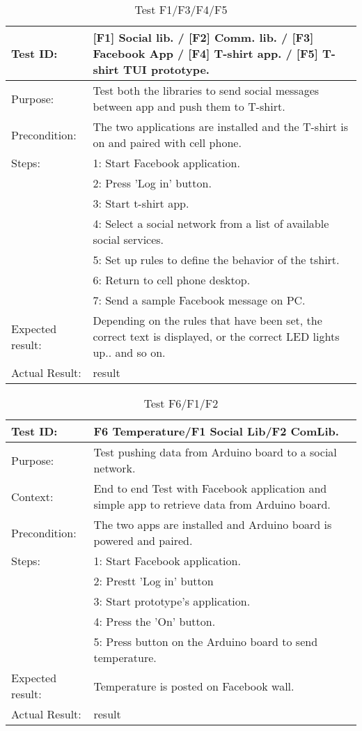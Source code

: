 \begin{table}[h!]
\begin{tabular}{|l|p{10cm}|}
\hline Test ID: &		[F1] Social lib. / [F2] Comm. lib. / [F3] Facebook App /
						[F4] T-shirt app. / [F5] T-shirt TUI prototype. \\
\hline Purpose: &		Test both the libraries to send social messages between app
						and push them to T-shirt.  \\
\hline Precondition: &	The two applications are installed and the T-shirt is on and paired with cell phone. \\
\hline
Steps:
  & 1: Start Facebook application.\\ 
  & 2: Press 'Log in' button. \\ 
  & 3: Start t-shirt app. \\ 
  & 4: Select a social network from a list of available social services. \\
  & 5: Set up rules to define the behavior of the tshirt. \\
  & 6: Return to cell phone desktop. \\
  & 7: Send a sample Facebook message on PC. \\
\hline
Expected result:
   & Depending on the rules that have been set, the correct text is displayed,
   or the correct LED lights up.. and so on.\\ 
\hline
Actual Result:
  &  result \\
\hline
\end{tabular}
\caption{Test F1/F3/F4/F5}
\label{tbl:f1f3f4f5test}
\end{table}

\begin{table}[h!]
\begin{tabular}{|l|p{10cm}|}
\hline Test ID: & F6 Temperature/F1 Social Lib/F2 ComLib. \\ 
\hline Purpose: & Test pushing data from Arduino board to a social network.  \\ 
\hline Context: & End to end Test with Facebook application and simple app to retrieve data from Arduino board. \\ 
\hline Precondition: & The two apps are installed and Arduino board is powered and paired. \\ 
\hline
Steps:
  & 1: Start Facebook application. \\
  & 2: Prestt 'Log in' button\\ 
  & 3: Start prototype's application. \\ 
  & 4: Press the 'On' button. \\
  & 5: Press button on the Arduino board to send temperature. \\ 
\hline
Expected result:
  & Temperature is posted on Facebook wall. \\ 
\hline
Actual Result:
  & result \\
\hline
\end{tabular}
\caption{Test F6/F1/F2}
\label{tbl:f6f1f2test}
\end{table}

